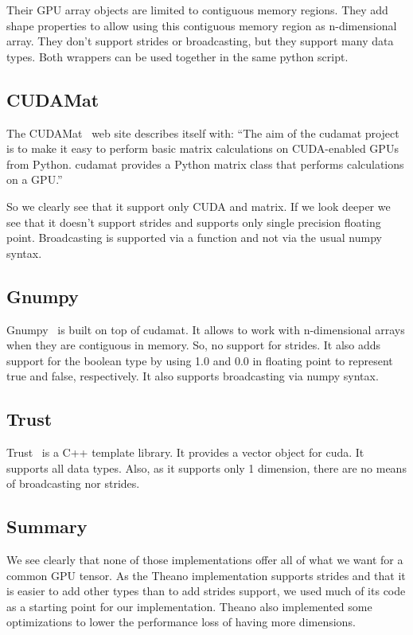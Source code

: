 \documentclass{article} %
\begin{document}
Their GPU array objects are limited to contiguous memory regions. They add shape properties to allow using this contiguous memory region as n-dimensional array. They don't support strides or broadcasting, but they support many data types. Both wrappers can be used together in the same python script.

\subsection{CUDAMat}
The CUDAMat~\citep{cudamat-TR2009} web site describes itself with: ``The aim of the cudamat project is to make it easy to perform basic matrix calculations on CUDA-enabled GPUs from Python. cudamat provides a Python matrix class that performs calculations on a GPU.''

So we clearly see that it support only CUDA and matrix. If we look deeper we see that it doesn't support strides and supports only single precision floating point. Broadcasting is supported via a function and not via the usual numpy syntax.

\subsection{Gnumpy}
Gnumpy~\citep{gnumpy-TR2010} is built on top of cudamat. It allows to work with n-dimensional arrays when they are contiguous in memory. So, no support for strides. It also adds support for the boolean type by using 1.0 and 0.0 in floating point to represent true and false, respectively. It also supports broadcasting via numpy syntax.

\subsection{Trust}
Trust~\citep{Thrust} is a C++ template library. It provides a vector object for cuda. It supports all data types.  Also, as it supports only 1 dimension, there are no means of broadcasting nor strides.

\subsection{Summary}
We see clearly that none of those implementations offer all of what we want for a common GPU tensor. As the Theano implementation supports strides and that it is easier to add other types than to add strides support, we used much of its code as a starting point for our implementation. Theano also implemented some optimizations to lower the performance loss of having more dimensions.
\end{document}
